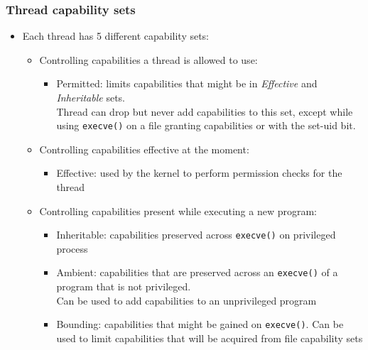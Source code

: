 \begin{frame}
	\frametitle{Thread capability sets}
	\begin{itemize}
		\item Each thread has 5 different capability sets:
			\begin{itemize}
				\item Controlling capabilities a thread is allowed to use:
					\begin{itemize}
						\item Permitted: limits capabilities that might be in \emph{Effective}
							and \emph{Inheritable} sets.\\
							Thread can drop but never add capabilities to this set, except while using
							\texttt{execve()} on a file granting capabilities or with the set-uid bit.
					\end{itemize}
				\item Controlling capabilities effective at the moment:
					\begin{itemize}
						\item Effective: used by the kernel to perform permission checks for the
							thread
					\end{itemize}
				\item Controlling capabilities present while executing a new program:
					\begin{itemize}
						\item Inheritable: capabilities preserved across \texttt{execve()} on
							privileged process
						\item Ambient: capabilities that are preserved across an \texttt{execve()}
							of a program that is not privileged.\\
							Can be used to add capabilities to an unprivileged program
						\item Bounding: capabilities that might be gained on \texttt{execve()}.
							Can be used to limit capabilities that will be acquired from file
							capability sets
					\end{itemize}
			\end{itemize}
	\end{itemize}
\end{frame}

